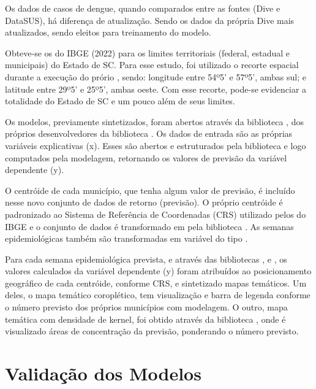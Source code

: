 \documentclass[
	12pt,				%
	openright,			%
	oneside,			%
	a4paper,			%
	english,			%
	french,				%
	spanish,			%
	brazil				%
	dvipsnames, table]{abntex2}
\begin{document}
\indent Os dados de casos de dengue, quando comparados entre as fontes (\acrshort{Dive} e \acrshort{DataSUS}), há diferença de atualização. Sendo os dados da própria \acrshort{Dive} mais atualizados, sendo eleitos para treinamento do modelo.

\indent Obteve-se os  do \acrshort{IBGE} (2022) para os limites territoriais (federal, estadual e municipais) do Estado de \acrlong{SC}. Para esse estudo, foi utilizado o recorte espacial durante a execução do prório , sendo: longitude entre 54º5' e 57º5', ambas sul; e latitude entre 29º5' e 25º5', ambas oeste. Com esse recorte, pode-se evidenciar a totalidade do Estado de \acrlong{SC} e um pouco além de seus limites.

\indent Os modelos, previamente sintetizados, foram abertos através da biblioteca , dos próprios desenvolvedores da biblioteca . Os dados de entrada são as próprias variáveis explicativas (x). Esses são abertos e estruturados pela biblioteca  e logo computados pela modelagem, retornando os valores de previsão da variável dependente (y).

\indent O centróide de cada município, que tenha algum valor de previsão, é incluído nesse novo conjunto de dados de retorno (previsão). O próprio centróide é padronizado ao Sistema de Referência de Coordenadas (\acrfull{CRS}) utilizado pelos  do \acrshort{IBGE} e o conjunto  de dados é transformado em  pela biblioteca . As semanas epidemiológicas também são transformadas em variável do tipo .

\indent Para cada semana epidemiológica prevista, e através das bibliotecas ,  e , os valores calculados da variável dependente (y) foram atribuídos ao posicionamento geográfico de cada centróide, conforme \acrshort{CRS}, e sintetizado mapas temáticos. Um deles, o mapa temático coroplético, tem visualização e barra de legenda conforme o número previsto dos próprios municípios com modelagem. O outro, mapa temática com densidade de kernel, foi obtido através da biblioteca , onde é visualizado áreas de concentração da previsão, ponderando o número previsto.

\section{Validação dos Modelos}
\end{document}
